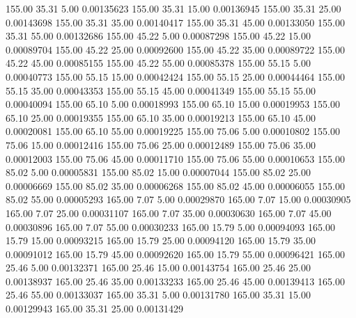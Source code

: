     155.00     35.31      5.00     0.00135623
    155.00     35.31     15.00     0.00136945
    155.00     35.31     25.00     0.00143698
    155.00     35.31     35.00     0.00140417
    155.00     35.31     45.00     0.00133050
    155.00     35.31     55.00     0.00132686
    155.00     45.22      5.00     0.00087298
    155.00     45.22     15.00     0.00089704
    155.00     45.22     25.00     0.00092600
    155.00     45.22     35.00     0.00089722
    155.00     45.22     45.00     0.00085155
    155.00     45.22     55.00     0.00085378
    155.00     55.15      5.00     0.00040773
    155.00     55.15     15.00     0.00042424
    155.00     55.15     25.00     0.00044464
    155.00     55.15     35.00     0.00043353
    155.00     55.15     45.00     0.00041349
    155.00     55.15     55.00     0.00040094
    155.00     65.10      5.00     0.00018993
    155.00     65.10     15.00     0.00019953
    155.00     65.10     25.00     0.00019355
    155.00     65.10     35.00     0.00019213
    155.00     65.10     45.00     0.00020081
    155.00     65.10     55.00     0.00019225
    155.00     75.06      5.00     0.00010802
    155.00     75.06     15.00     0.00012416
    155.00     75.06     25.00     0.00012489
    155.00     75.06     35.00     0.00012003
    155.00     75.06     45.00     0.00011710
    155.00     75.06     55.00     0.00010653
    155.00     85.02      5.00     0.00005831
    155.00     85.02     15.00     0.00007044
    155.00     85.02     25.00     0.00006669
    155.00     85.02     35.00     0.00006268
    155.00     85.02     45.00     0.00006055
    155.00     85.02     55.00     0.00005293
    165.00      7.07      5.00     0.00029870
    165.00      7.07     15.00     0.00030905
    165.00      7.07     25.00     0.00031107
    165.00      7.07     35.00     0.00030630
    165.00      7.07     45.00     0.00030896
    165.00      7.07     55.00     0.00030233
    165.00     15.79      5.00     0.00094093
    165.00     15.79     15.00     0.00093215
    165.00     15.79     25.00     0.00094120
    165.00     15.79     35.00     0.00091012
    165.00     15.79     45.00     0.00092620
    165.00     15.79     55.00     0.00096421
    165.00     25.46      5.00     0.00132371
    165.00     25.46     15.00     0.00143754
    165.00     25.46     25.00     0.00138937
    165.00     25.46     35.00     0.00133233
    165.00     25.46     45.00     0.00139413
    165.00     25.46     55.00     0.00133037
    165.00     35.31      5.00     0.00131780
    165.00     35.31     15.00     0.00129943
    165.00     35.31     25.00     0.00131429
